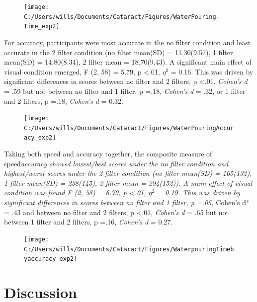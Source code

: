 \documentclass[
  english,
  man,floatsintext]{apa6}
\begin{document}
\begin{figure}

{\centering \texttt{[image: C:/Users/wills/Documents/Cataract/Figures/WaterPouring-Time\_exp2]} 

}

\caption{ }\label{fig:unnamed-chunk-10}
\end{figure}

For accuracy, participants were most accurate in the no filter condition and least accurate in the 2 filter condition (no filter mean(SD) = 11.30(9.57), 1 filter mean(SD) = 14.80(8.34), 2 filter mean = 18.70(9.43).
A significant main effect of visual condition emerged, F (2, 58) = 5.79, p \textless{}.01, \(\eta^2\) = 0.16.
This was driven by significant differences in scores between no filter and 2 filters, p \textless{}.01, \emph{Cohen's d} = .59 but not between no filter and 1 filter, p =.18, \emph{Cohen's d} = .32, or 1 filter and 2 filters, p =.18, \emph{Cohen's d} = 0.32.

\begin{figure}

{\centering \texttt{[image: C:/Users/wills/Documents/Cataract/Figures/WaterPouringAccuracy\_exp2]} 

}

\caption{ }\label{fig:unnamed-chunk-11}
\end{figure}

Taking both speed and accuracy together, the composite measure of speed\emph{accuracy showed lowest/best scores under the no filter condition and highest/worst scores under the 2 filter condition (no filter mean(SD) = 165(132), 1 filter mean(SD) = 238(145), 2 filter mean = 294(152)).
A main effect of visual condition was found F (2, 58) = 6.70, p \textless{}.01, \(\eta^2\) = 0.19.
This was driven by significant differences in scores between no filter and 1 filter, p =.05, }Cohen's d* = .43 and between no filter and 2 filters, p \textless{}.01, \emph{Cohen's d} = .65 but not between 1 filter and 2 filters, p =.16, \emph{Cohen's d} = 0.27.

\begin{figure}

{\centering \texttt{[image: C:/Users/wills/Documents/Cataract/Figures/WaterpouringTimebyaccuracy\_exp2]} 

}

\caption{ }\label{fig:unnamed-chunk-12}
\end{figure}

\hypertarget{discussion-1}{%
\section{Discussion}\label{discussion-1}}
\end{document}
